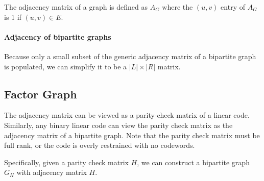 \documentclass{idc_msc}
\begin{document}
The adjacency matrix of a graph is defined as \(A_G\) where the \((u,v)\) entry of \(A_G\) is 1 if \((u,v) \in E\).

\paragraph{Adjacency of bipartite graphs}

Because only a small subset of the generic adjacency matrix of a bipartite graph is populated, we can simplify it to be a \(|L| \times |R|\) matrix.






\subsection{Factor Graph}

The adjacency matrix can be viewed as a parity-check matrix of a linear code.
Similarly, any binary linear code can view the parity check matrix as the adjacency matrix of a bipartite graph.
Note that the parity check matrix must be full rank, or the code is overly restrained with no codewords.

Specifically, given a parity check matrix \(H\), we can construct a bipartite graph \(G_H\) with adjacency matrix \(H\).
\end{document}
